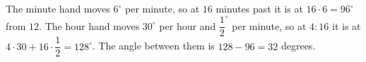 The minute hand moves $6^\circ$ per minute, so at $16$ minutes past it is at $16\cdot6=96^\circ$ from $12$. The hour hand moves $30^\circ$ per hour and $\dfrac{1}{2}^\circ$ per minute, so at $4{:}16$ it is at $4\cdot30+16\cdot\dfrac{1}{2}=128^\circ$. The angle between them is $128-96=\boxed{32}$ degrees.

